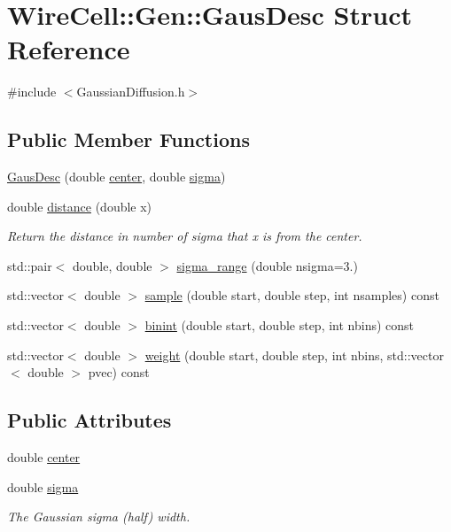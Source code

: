 \hypertarget{struct_wire_cell_1_1_gen_1_1_gaus_desc}{}\section{Wire\+Cell\+:\+:Gen\+:\+:Gaus\+Desc Struct Reference}
\label{struct_wire_cell_1_1_gen_1_1_gaus_desc}


{\ttfamily \#include $<$Gaussian\+Diffusion.\+h$>$}

\subsection*{Public Member Functions}
\begin{DoxyCompactItemize}
\item 
\hyperlink{struct_wire_cell_1_1_gen_1_1_gaus_desc_a3cb2ea1d5e31b758df540cdd6cace465}{Gaus\+Desc} (double \hyperlink{struct_wire_cell_1_1_gen_1_1_gaus_desc_aee8eb7e424437c7bab67828f4bf78c77}{center}, double \hyperlink{struct_wire_cell_1_1_gen_1_1_gaus_desc_aa9d4b50ba1852c92f5e9b8bb7d63c2bd}{sigma})
\item 
double \hyperlink{struct_wire_cell_1_1_gen_1_1_gaus_desc_a769c9958842435a1dba72113be6d8f09}{distance} (double x)
\begin{DoxyCompactList}\small\item\em Return the distance in number of sigma that x is from the center. \end{DoxyCompactList}\item 
std\+::pair$<$ double, double $>$ \hyperlink{struct_wire_cell_1_1_gen_1_1_gaus_desc_a5340bfa4adeaccdcac2766ecd1b4a3b0}{sigma\+\_\+range} (double nsigma=3.)
\item 
std\+::vector$<$ double $>$ \hyperlink{struct_wire_cell_1_1_gen_1_1_gaus_desc_a0d636bf5b689646d52f07cac3432824e}{sample} (double start, double step, int nsamples) const
\item 
std\+::vector$<$ double $>$ \hyperlink{struct_wire_cell_1_1_gen_1_1_gaus_desc_a1b437283fecc3cbfcdb616179381d666}{binint} (double start, double step, int nbins) const
\item 
std\+::vector$<$ double $>$ \hyperlink{struct_wire_cell_1_1_gen_1_1_gaus_desc_aa7099866e931d552fead98c5fcfcefb8}{weight} (double start, double step, int nbins, std\+::vector$<$ double $>$ pvec) const
\end{DoxyCompactItemize}
\subsection*{Public Attributes}
\begin{DoxyCompactItemize}
\item 
double \hyperlink{struct_wire_cell_1_1_gen_1_1_gaus_desc_aee8eb7e424437c7bab67828f4bf78c77}{center}
\item 
double \hyperlink{struct_wire_cell_1_1_gen_1_1_gaus_desc_aa9d4b50ba1852c92f5e9b8bb7d63c2bd}{sigma}
\begin{DoxyCompactList}\small\item\em The Gaussian sigma (half) width. \end{DoxyCompactList}\end{DoxyCompactItemize}


